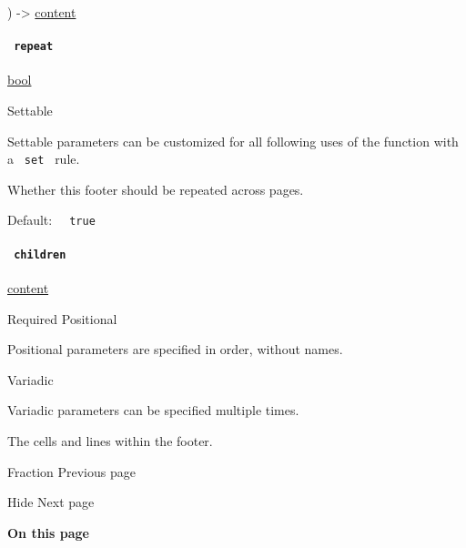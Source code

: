 ) -\textgreater{} \href{/docs/reference/foundations/content/}{content}

\paragraph{\texorpdfstring{\texttt{\ repeat\ }}{ repeat }}\label{definitions-footer-repeat}

\href{/docs/reference/foundations/bool/}{bool}

{{ Settable }}

\label{definitions-footer-repeat-settable-tooltip}
Settable parameters can be customized for all following uses of the
function with a \texttt{\ set\ } rule.

Whether this footer should be repeated across pages.

Default: \texttt{\ }{\texttt{\ true\ }}\texttt{\ }

\paragraph{\texorpdfstring{\texttt{\ children\ }}{ children }}\label{definitions-footer-children}

\href{/docs/reference/foundations/content/}{content}

{Required} {{ Positional }}

\label{definitions-footer-children-positional-tooltip}
Positional parameters are specified in order, without names.

{{ Variadic }}

\label{definitions-footer-children-variadic-tooltip}
Variadic parameters can be specified multiple times.

The cells and lines within the footer.

\href{/docs/reference/layout/fraction/}{\pandocbounded{}}

{ Fraction } { Previous page }

\href{/docs/reference/layout/hide/}{\pandocbounded{}}

{ Hide } { Next page }

\textbf{On this page}

